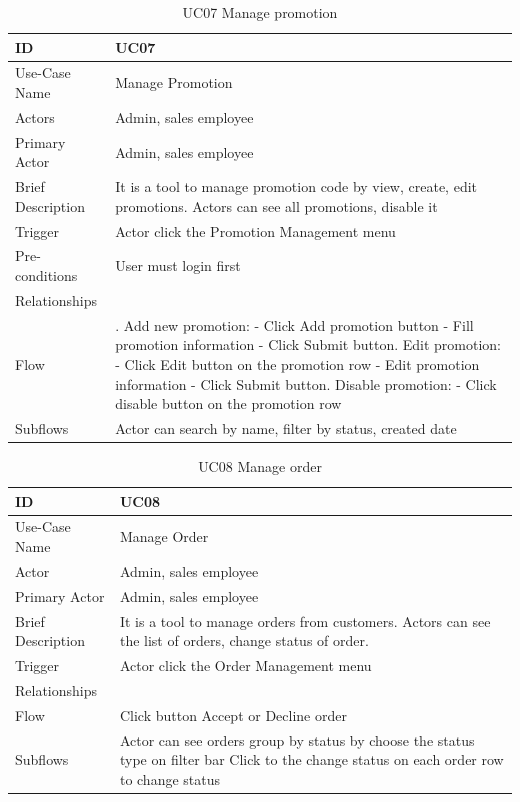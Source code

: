 \begin{table}
\begin{tabular}{|>{\raggedright\arraybackslash}p{5cm}|>{\raggedright\arraybackslash}p{10cm}|}
\hline
ID& UC07 \\
\hline
Use-Case Name& Manage Promotion \\
\hline
Actors& Admin, sales employee\\
\hline
Primary Actor& Admin, sales employee\\
\hline
Brief Description& It is a tool to manage promotion code by view, create, edit promotions. Actors can see all promotions, disable it\\
\hline
Trigger& Actor click the Promotion Management menu\\
\hline
Pre-conditions& User must login first \\
\hline
Relationships& \\
\hline
Flow& 
1. Add new promotion:\break
- Click Add promotion button \break
- Fill promotion information\break
- Click Submit button\break
2. Edit promotion:\break
- Click Edit button on the promotion row\break
- Edit promotion information\break
- Click Submit button\break
3. Disable promotion:\break
- Click disable button on the promotion row\\
\hline
Subflows& Actor can search by name, filter by status, created date\\
\hline
\end{tabular}
\caption{UC07 Manage promotion}
\label{tab:UC07}
\end{table}
\begin{table}
\begin{tabular}{|>{\raggedright\arraybackslash}p{5cm}|>{\raggedright\arraybackslash}p{10cm}|}
\hline
ID& UC08 \\
\hline
Use-Case Name& Manage Order \\
\hline
Actor& Admin, sales employee\\
\hline
Primary Actor& Admin, sales employee\\
\hline
Brief Description& It is a tool to manage orders from customers. \break Actors can see the list of orders, change status of order.\\
\hline
Trigger& Actor click the Order Management menu\\
\hline
Relationships& \\
\hline
Flow& Click button Accept or Decline order\\
\hline
Subflows& Actor can see orders group by status by choose the status type on filter bar\break
Click to the change status on each order row to change status\\
\hline
\end{tabular}
\caption{UC08 Manage order}
\label{tab:UC08}
\end{table}
